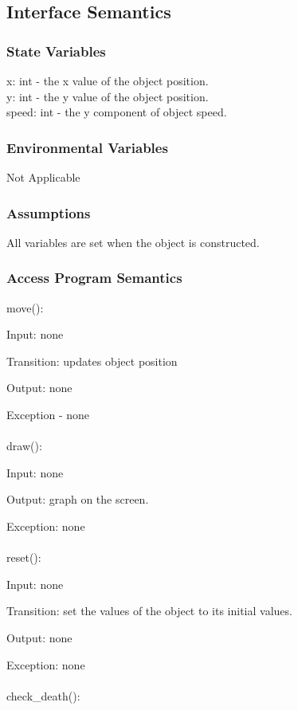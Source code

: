 \documentclass[12,english]{article}
\begin{document}
	\subsection{Interface Semantics}
		\subsubsection{State Variables}
		x: int - the x value of the object position.\\
		y: int - the y value of the object position.\\
		speed: int - the y component of object speed.\\
		\subsubsection{Environmental Variables}
		
		Not Applicable 
		
		\subsubsection{Assumptions}
		
		All variables are set when the object is constructed.

		\subsubsection{Access Program Semantics}
		
		move():
		
		Input: none
		
	  Transition: updates object position
	  
	  Output: none
	  
	  Exception - none \\
	  \\
	  draw():
		
		Input: none
			
		Output: graph on the screen.
			 
		Exception: none\\
		\\
		reset():
		
		Input: none
		
		Transition: set the values of the object to its initial values. 
			
		Output: none
			 
		Exception: none\\
		\\
		check\_death():
		
\end{document}
